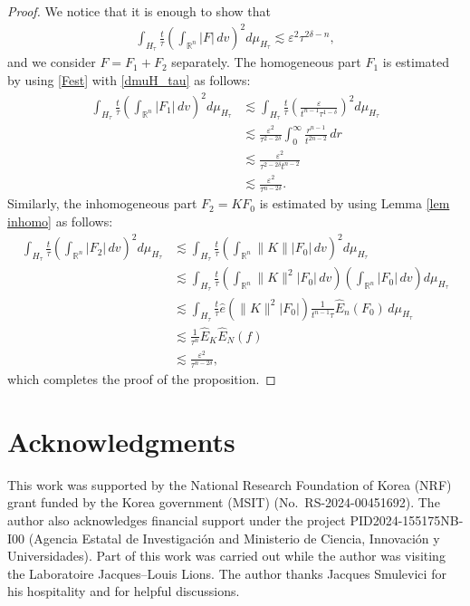 \documentclass{article}
\newcommand{\bbr}{{\mathbb R}}
\newcommand{\bbrn}{{\bbr^n}}
\begin{document}
\begin{proof}
We notice that it is enough to show that
\begin{align*}
\int_{ H_\tau } \frac{ t }{ \tau } \left( \int_\bbrn | F | \, d v \right)^2 d \mu_{ H_\tau } \lesssim \varepsilon^2 \tau^{ 2 \delta - n } ,
\end{align*}
and we consider $ F = F_1 + F_2 $ separately. The homogeneous part $ F_1 $ is estimated by using \eqref{Fest} with \eqref{dmuH_tau} as follows:
\begin{align*}
\int_{ H_\tau } \frac{ t }{ \tau } \left( \int_\bbrn | F_1 | \, d v \right)^2 d \mu_{ H_\tau } & \lesssim \int_{ H_\tau } \frac{ t }{ \tau } \left( \frac{ \varepsilon }{ t^{ n - 1 } \tau^{ 1 - \delta } } \right)^2 d \mu_{ H_\tau } \\
& \lesssim \frac{ \varepsilon^2 }{ \tau^{ 2 - 2 \delta } } \int_0^\infty \frac{ r^{ n - 1 } }{ t^{ 2 n - 2 } } \, d r \\
& \lesssim \frac{ \varepsilon^2 }{ \tau^{ 2 - 2 \delta } t^{ n - 2 } } \\
& \lesssim \frac{ \varepsilon^2 }{ \tau^{ n - 2 \delta } } .
\end{align*}
Similarly, the inhomogeneous part $ F_2 = K F_0 $ is estimated by using Lemma \ref{lem inhomo} as follows:
\begin{align*}
\int_{ H_\tau } \frac{ t }{ \tau } \left( \int_\bbrn | F_2 | \, d v \right)^2 d \mu_{ H_\tau } & \lesssim \int_{ H_\tau } \frac{ t }{ \tau } \left( \int_\bbrn \| K \| | F_0 | \, d v \right)^2 d \mu_{ H_\tau } \\
& \lesssim \int_{ H_\tau } \frac{ t }{ \tau } \left( \int_\bbrn \| K \|^2 | F_0 | \, d v \right) \left( \int_\bbrn | F_0 | \, d v \right) d \mu_{ H_\tau } \\
& \lesssim \int_{ H_\tau } \frac{ t }{ \tau } \hat{ e } ( \| K \|^2 | F_0 | ) \frac{ 1 }{ t^{ n - 1 } \tau } \hat{ E }_n ( F_0 ) \, d \mu_{ H_\tau } \\
& \lesssim \frac{ 1 }{ \tau^n } \hat{ E }_K \hat{ E }_N ( f ) \\
& \lesssim \frac{ \varepsilon^2 }{ \tau^{ n - 2 \delta } } ,
\end{align*}
which completes the proof of the proposition.
\end{proof}





\section*{Acknowledgments}
This work was supported by the National Research Foundation of Korea (NRF) grant funded by the Korea government (MSIT) (No.\ RS-2024-00451692). The author also acknowledges financial support under the project PID2024-155175NB-I00 (Agencia Estatal de Investigaci{\'o}n and Ministerio de Ciencia, Innovaci{\'o}n y Universidades). Part of this work was carried out while the author was visiting the Laboratoire Jacques--Louis Lions. The author thanks Jacques Smulevici for his hospitality and for helpful discussions.
\end{document}
